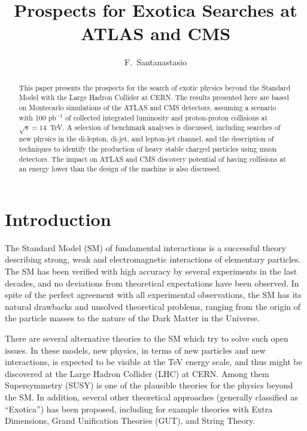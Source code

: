 \documentclass{cimento}
\title{Prospects for Exotica Searches at ATLAS and CMS}
\author{F.~Santanastasio\from{ins:UMD}\ETC
}
\begin{document}
\maketitle

\begin{abstract}
This paper presents the prospects for the search of exotic physics 
beyond the Standard Model with the Large Hadron Collider at CERN. 
The results presented here are based on Montecarlo simulations of the
ATLAS and CMS detectors, assuming a scenario with 
100 pb$^{-1}$ of collected integrated luminosity and proton-proton collisions 
at $\sqrt{s} = 14$~TeV. A selection of benchmark analyses is discussed, 
including searches of new physics in the di-lepton, di-jet, and lepton-jet channel, 
and the description of techniques to identify the production of 
heavy stable charged particles using muon detectors. 
The impact on ATLAS and CMS discovery potential 
of having collisions at an energy lower than the design of the machine 
is also discussed.
\end{abstract}

\section{Introduction}
The Standard Model (SM) of fundamental interactions is a successful theory 
describing strong, weak and electromagnetic interactions of elementary 
particles. The SM has been verified with high accuracy by several experiments 
in the last decades, and no deviations from theoretical expectations 
have been observed. In spite of the perfect agreement with all experimental 
observations, the SM has its natural drawbacks and unsolved theoretical 
problems, ranging from the origin of the particle masses to the nature of the 
Dark Matter in the Universe.

There are several alternative theories to the SM which try to solve such 
open issues. In these models, new physics, in terms of new particles and 
new interactions, is expected to be visible at the TeV energy scale, and 
thus might be discovered at the Large Hadron Collider (LHC) at CERN.
Among them Supersymmetry (SUSY) is one of the plausible theories for the physics 
beyond the SM. In addition, several other theoretical approaches (generally classified 
as ``Exotica'') has been proposed, including for example theories with Extra Dimensions, 
Grand Unification Theories (GUT), and String Theory. 

\end{document}
